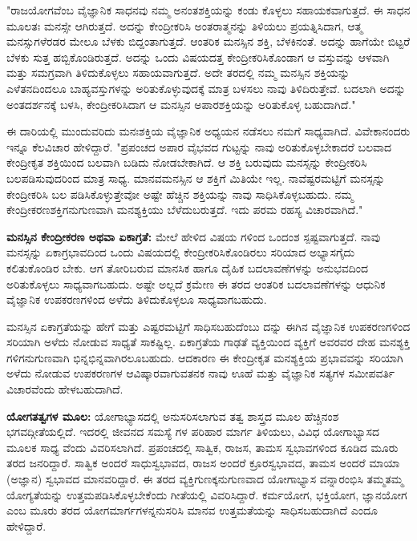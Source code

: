 "ರಾಜಯೋಗವೆಂಬ ವೈಜ್ಞಾನಿಕ ಸಾಧನವು ನಮ್ಮ ಅನಂತಶಕ್ತಿಯನ್ನು ಕಂಡು ಕೊಳ್ಳಲು ಸಹಾಯಕವಾಗುತ್ತದೆ. ಈ ಸಾಧನ ಮೂಲತಃ ಮನಸ್ಸೇ ಆಗಿರುತ್ತದೆ. ಅದನ್ನು ಕೇಂದ್ರೀಕರಿಸಿ ಅಂತರಾತ್ಮನನ್ನು ತಿಳಿಯಲು ಪ್ರಯತ್ನಿಸಿದಾಗ, ಆತ್ಮ ಮನಸ್ಸುಗಳೆರಡರ ಮೇಲೂ ಬೆಳಕು ಬಿದ್ದಂತಾಗುತ್ತದೆ. ಆಂತರಿಕ ಮನಸ್ಸಿನ ಶಕ್ತಿ, ಬೆಳಕಿನಂತೆ. ಅದನ್ನು ಹಾಗೆಯೇ ಬಿಟ್ಟರೆ ಬೆಳಕು ಸುತ್ತ ಹಬ್ಬಿಕೊಂಡಿರುತ್ತದೆ. ಅದನ್ನು ಒಂದು ವಿಷಯದತ್ತ ಕೇಂದ್ರೀಕರಿಸಿಕೊಂಡಾಗ ಆ ವಸ್ತುವನ್ನು ಆಳವಾಗಿ ಮತ್ತು ಸಮಗ್ರವಾಗಿ ತಿಳಿದುಕೊಳ್ಳಲು ಸಹಾಯವಾಗುತ್ತದೆ. ಅದೇ ತರದಲ್ಲಿ ನಮ್ಮ ಮನಸ್ಸಿನ ಶಕ್ತಿಯನ್ನು ಎಳೆತನದಿಂದಲೂ ಬಾಹ್ಯವಸ್ತುಗಳನ್ನು ಅರಿತುಕೊಳ್ಳುವುದಕ್ಕೆ ಮಾತ್ರ ಬಳಸಲು ನಾವು ತಿಳಿದಿರುತ್ತೇವೆ. ಬದಲಾಗಿ ಅದನ್ನು ಅಂತದರ್ಶನಕ್ಕೆ ಬಳಸಿ, ಕೇಂದ್ರೀಕರಿಸಿದಾಗ ಆ ಮನಸ್ಸಿನ ಅಪಾರಶಕ್ತಿಯನ್ನು ಅರಿತುಕೊಳ್ಳ ಬಹುದಾಗಿದೆ."

ಈ ದಾರಿಯಲ್ಲಿ ಮುಂದುವರಿದು ಮನಃಶಕ್ತಿಯ ವೈಜ್ಞಾನಿಕ ಅಧ್ಯಯನ ನಡೆಸಲು ನಮಗೆ ಸಾಧ್ಯವಾಗಿದೆ. ವಿವೇಕಾನಂದರು ಇನ್ನೂ ಕೆಲವಿಚಾರ ಹೇಳಿದ್ದಾರೆ. "ಪ್ರಪಂಚದ ಅಪಾರ ವೈಭವದ ಗುಟ್ಟನ್ನು ನಾವು ಅರಿತುಕೊಳ್ಳಬೇಕಾದರೆ ಬಲವಾದ ಕೇಂದ್ರೀಕೃತ ಶಕ್ತಿಯಿಂದ ಬಲವಾಗಿ ಬಡಿದು ನೋಡಬೇಕಾಗಿದೆ. ಆ ಶಕ್ತಿ ಬರುವುದು ಮನಸ್ಸನ್ನು ಕೇಂದ್ರೀಕರಿಸಿ ಬಲಪಡಿಸುವುದರಿಂದ ಮಾತ್ರ ಸಾಧ್ಯ. ಮಾನವಮನಸ್ಸಿನ ಆ ಶಕ್ತಿಗೆ ಮಿತಿಯೇ ಇಲ್ಲ. ನಾವೆಷ್ಟರಮಟ್ಟಿಗೆ ಮನಸ್ಸನ್ನು ಕೇಂದ್ರೀಕರಿಸಿ ಬಲ ಪಡಿಸಿಕೊಳ್ಳುತ್ತೇವೋ ಅಷ್ಟೇ ಹೆಚ್ಚಿನ ಶಕ್ತಿಯನ್ನು ನಾವು ಸಾಧಿಸಿಕೊಳ್ಳಬಹುದು. ನಮ್ಮ ಕೇಂದ್ರೀಕರಣಶಕ್ತಿಗನುಗುಣವಾಗಿ ಮನಶ್ಯಕ್ತಿಯು ಬೆಳೆದುಬರುತ್ತದೆ. ಇದು ಪರಮ ರಹಸ್ಯ ವಿಚಾರವಾಗಿದೆ."

\textbf{ಮನಸ್ಸಿನ ಕೇಂದ್ರೀಕರಣ ಅಥವಾ ಏಕಾಗ್ರತೆ:} ಮೇಲೆ ಹೇಳಿದ ವಿಷಯ ಗಳಿಂದ ಒಂದಂಶ ಸ್ಪಷ್ಟವಾಗುತ್ತದೆ. ನಾವು ಮನಸ್ಸನ್ನು ಏಕಾಗ್ರಭಾವದಿಂದ ಒಂದು ವಿಷಯದಲ್ಲಿ ಕೇಂದ್ರೀಕರಿಸಿಕೊಂಡಿರಲು ಸರಿಯಾದ ಅಭ್ಯಾಸಗೈದು ಕಲಿತುಕೊಂಡಿರ ಬೇಕು. ಆಗ ತೋರಿಬರುವ ಮಾನಸಿಕ ಹಾಗೂ ದೈಹಿಕ ಬದಲಾವಣೆಗಳನ್ನು ಅನುಭವದಿಂದ ಅರಿತುಕೊಳ್ಳಲು ಸಾಧ್ಯವಾಗಬಹುದು. ಅಷ್ಟೇ ಅಲ್ಲದೆ ಕ್ರಮೇಣ ಈ ತರದ ಆಂತರಿಕ ಬದಲಾವಣೆಗಳನ್ನು ಆಧುನಿಕ ವೈಜ್ಞಾನಿಕ ಉಪಕರಣಗಳಿಂದ ಅಳೆದು ತಿಳಿದುಕೊಳ್ಳಲೂ ಸಾಧ್ಯವಾಗಬಹುದು.

ಮನಸ್ಸಿನ ಏಕಾಗ್ರತೆಯನ್ನು ಹೇಗೆ ಮತ್ತು ಎಷ್ಟರಮಟ್ಟಿಗೆ ಸಾಧಿಸಬಹುದೆಂಬು ದನ್ನು ಈಗಿನ ವೈಜ್ಞಾನಿಕ ಉಪಕರಣಗಳಿಂದ ಸರಿಯಾಗಿ ಅಳೆದು ನೋಡುವ ಸಾಧ್ಯತೆ ಸಾಕಷ್ಟಿಲ್ಲ. ಏಕಾಗ್ರತೆಯ ಗಾಢತೆ ವ್ಯಕ್ತಿಯಿಂದ ವ್ಯಕ್ತಿಗೆ ಅವರವರ ದೇಹ ಮನಶ್ಯಕ್ತಿ ಗಳಿಗನುಗುಣವಾಗಿ ಭಿನ್ನಭಿನ್ನವಾಗಿರಲೂಬಹುದು. ಆದಕಾರಣ ಈ ಕೇಂದ್ರೀಕೃತ ಮನಶ್ಯಕ್ತಿಯ ಪ್ರಭಾವವನ್ನು ಸರಿಯಾಗಿ ಅಳೆದು ನೋಡುವ ಉಪಕರಣಗಳ ಆವಿಷ್ಕಾರವಾಗುವತನಕ ನಾವು ಊಹೆ ಮತ್ತು ವೈಜ್ಞಾನಿಕ ಸತ್ಯಗಳ ಸಮೀಪವರ್ತಿ ವಿಚಾರವೆಂದು ಹೇಳಬಹುದಾಗಿದೆ.

\textbf{ಯೋಗತತ್ವಗಳ ಮೂಲ:} ಯೋಗಾಭ್ಯಾಸದಲ್ಲಿ ಅನುಸರಿಸಲಾಗುವ ತತ್ವ ಶಾಸ್ತ್ರದ ಮೂಲ ಹೆಚ್ಚಿನಂಶ ಭಗವದ್ಗೀತೆಯಲ್ಲಿದೆ. ಇದರಲ್ಲಿ ಜೀವನದ ಸಮಸ್ಯೆ ಗಳ ಪರಿಹಾರ ಮಾರ್ಗ ತಿಳಿಯಲು, ವಿವಿಧ ಯೋಗಾಭ್ಯಾಸದ ಮೂಲಕ ಸಾಧ್ಯ ವೆಂದು ವಿವರಿಸಲಾಗಿದೆ. ಪ್ರಪಂಚದಲ್ಲಿ ಸಾತ್ವಿಕ, ರಾಜಸ, ತಾಮಸ ಸ್ವಭಾವಗಳಿಂದ ಕೂಡಿದ ಮೂರು ತರದ ಜನರಿದ್ದಾರೆ. ಸಾತ್ವಿಕ ಅಂದರೆ ಸಾಧುಸ್ವಭಾವದ, ರಾಜಸ ಅಂದರೆ ಕ್ರೂರಸ್ವಭಾವದ, ತಾಮಸ ಅಂದರೆ ಮಾಯಾ (ಅಜ್ಞಾನ) ಸ್ವಭಾವದ ಮಾನವರಿದ್ದಾರೆ. ಈ ತರದ ವ್ಯಕ್ತಿಗುಣಕ್ಕನುಗುಣವಾದ ಯೋಗಾಭ್ಯಾಸ ವನ್ನಾರಂಭಿಸಿ ತಮ್ಮತಮ್ಮ ಯೋಗ್ಯತೆಯನ್ನು ಉತ್ತಮಪಡಿಸಿಕೊಳ್ಳಬೇಕೆಂದು ಗೀತೆಯಲ್ಲಿ ವಿವರಿಸಿದ್ದಾರೆ. ಕರ್ಮಯೋಗ, ಭಕ್ತಿಯೋಗ, ಜ್ಞಾನಯೋಗ ಎಂಬ ಮೂರು ತರದ ಯೋಗಮಾರ್ಗಗಳನ್ನನುಸರಿಸಿ ಮಾನವ ಉತ್ತಮತೆಯನ್ನು ಸಾಧಿಸಬಹುದಾಗಿದೆ ಎಂದೂ ಹೇಳಿದ್ದಾರೆ.

